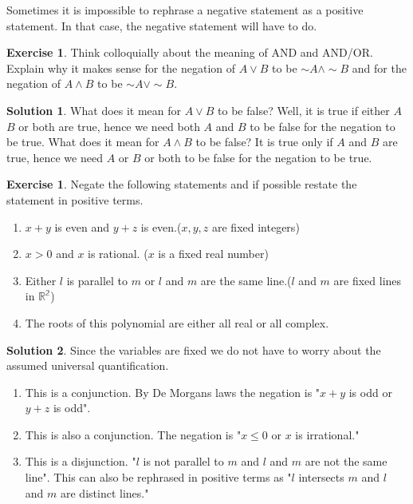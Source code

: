 \documentclass[a4paper, 11pt]{report}
\theoremstyle{plain}
\theoremstyle{definition}
\newtheorem{exrc}[thm]{Exercise}
\newtheorem*{sltn}{Solution}
\renewcommand{\neg}{{\sim}} %
\begin{document}
  Sometimes it is impossible to rephrase a negative statement as a positive
  statement. In that case, the negative statement will have to do.

  \begin{exrc}
    Think colloquially about the meaning of AND and AND/OR. Explain why it
    makes sense for the negation of $A \lor B$ to be $\neg A \land \neg B$ and
    for the negation of $A \land B$ to be $\neg A \lor \neg B$.
  \end{exrc}
  \begin{sltn}
    What does it mean for $A \lor B$ to be false? Well, it is true if either
    $A$  $B$ or both are true, hence we need both $A$ and $B$ to be false for
    the negation to be true.  What does it mean for $A \land B$ to be false? It
    is true only if $A$ and $B$ are true, hence we need $A$ or $B$ or both to
    be false for the negation to be true.
  \end{sltn}

  \begin{exrc}
    Negate the following statements and if possible restate the statement in positive terms.
    \begin{enumerate}
      \item $x + y$ is even and $y + z$ is even.($x, y, z$ are fixed integers)
      \item $x > 0$ and $x$ is rational. ($x$ is a fixed real number)
      \item Either $l$ is parallel to $m$ or $l$ and $m$ are the same line.($l$ and $m$ are fixed lines in $\mathbb{R^2}$)
      \item The roots of this polynomial are either all real or all complex. 
    \end{enumerate}
  \end{exrc}
  
  \begin{sltn}
    Since the variables are fixed we do not have to worry about the assumed
    universal quantification.
    \begin{enumerate}
      \item This is a conjunction. By De Morgans laws the negation is "$x + y$
        is odd or $y + z$ is odd".
      \item This is also a conjunction. The negation is "$x \leq 0$ or $x$ is
        irrational."
      \item This is a disjunction.  "$l$ is not parallel to $m$ and $l$ and $m$
        are not the same line". This can also be rephrased in positive terms as
        "$l$ intersects $m$ and $l$ and $m$ are distinct lines."
    \end{enumerate}
  \end{sltn}
\printindex
\listoftheorems[ignoreall, show=exrc]
\end{document}
